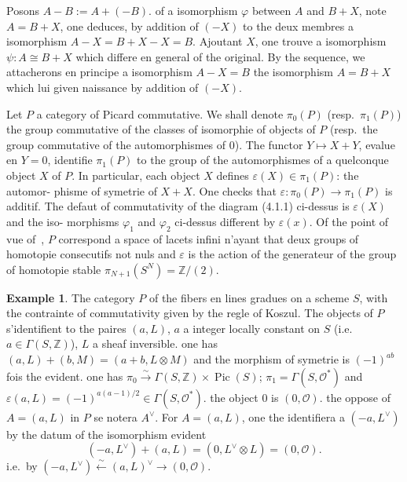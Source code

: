 \documentclass[12pt,a4paper]{article}
\theoremstyle{plain}
\theoremstyle{definition}
\newtheorem{example}[theorem]{Example}
\DeclareMathOperator{\Pic}{Pic}
\newcommand{\ZZ}{\mathbb{Z}}
\newcommand{\Oo}{\mathscr{O}}
\begin{document}
Posons $A - B := A + (-B)$. of a isomorphism $\varphi$ between $A$ and $B + X$, note
$A = B + X$, one deduces, by addition of $(-X)$ to the deux membres a isomorphism
$A - X = B + X - X = B$. Ajoutant $X$, one trouve a isomorphism $\psi: A \cong B + X$
which differe en general of the original. By the sequence, we attacherons en principe
a isomorphism $A - X = B$ the isomorphism $A = B + X$ which lui given naissance
by addition of $(-X)$.

Let $P$ a category of Picard commutative. We shall denote $\pi_0(P)$ (resp.\ $\pi_1(P)$) the group commutative of the classes of isomorphie of objects of $P$ (resp.\ the
group commutative of the automorphismes of $0$). The functor $Y \mapsto X + Y$, evalue
en $Y = 0$, identifie $\pi_1(P)$ to the group of the automorphismes of a quelconque object
$X$ of $P$. In particular, each object $X$ defines $\varepsilon(X) \in \pi_1(P)$: the automor-
phisme of symetrie of $X + X$. One checks that $\varepsilon: \pi_0(P) \to \pi_1(P)$ is additif.
The defaut of commutativity of the diagram (4.1.1) ci-dessus is $\varepsilon(X)$ and the iso-
morphisms $\varphi_1$ and $\varphi_2$ ci-dessus different by $\varepsilon(x)$. Of the point of vue of~\cite{9},
$P$ correspond a space of lacets infini n'ayant that deux groups of homotopie
consecutifs not nuls and $\varepsilon$ is the action of the generateur of the group of homotopie stable
$\pi_{N+1}(S^N) = \ZZ/(2)$.

\begin{example}
The category $P$ of the fibers en lines gradues on a scheme $S$, with
the contrainte of commutativity given by the regle of Koszul. The objects of $P$
s'identifient to the paires $(a, L)$, $a$ a integer locally constant on $S$ (i.e.\ $a \in \Gamma(S, \ZZ)$), $L$ a sheaf inversible. one has $(a, L) + (b, M) = (a + b, L \otimes M)$
and the morphism of symetrie is $(-1)^{ab}$ fois the evident. one has $\pi_0 \xrightarrow{\sim} \Gamma(S, \ZZ) \times \Pic(S)$;
$\pi_1 = \Gamma(S, \Oo^*)$ and $\varepsilon(a, L) = (-1)^{a(a-1)/2} \in \Gamma(S, \Oo^*)$. the object $0$ is $(0, \Oo)$. the oppose of $A = (a, L)$
in $P$ se notera $A^\vee$. For $A = (a, L)$, one the identifiera a $(-a, L^\vee)$ by
the datum of the isomorphism evident
\[
(-a, L^\vee) + (a, L) = (0, L^\vee \otimes L) = (0, \Oo) .
\]
i.e.\ by $(-a, L^\vee) \xleftarrow{\sim} (a, L)^\vee \to (0, \Oo)$.
\end{example}

\subsection{}
\end{document}
